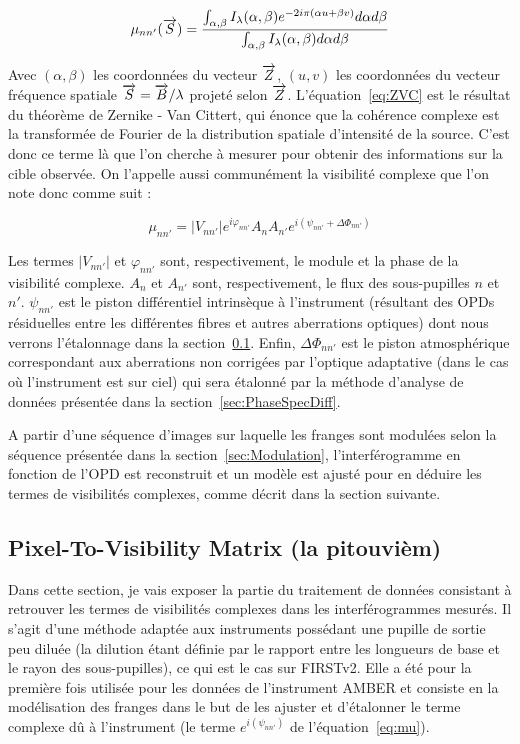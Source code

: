\begin{equation}
    \mu_{nn'}(\overrightarrow{S}) = \frac{\int_{\alpha, \beta} I_{\lambda}(\alpha,\beta) e^{-2i\pi (\alpha u + \beta v)} d\alpha d\beta}{\int_{\alpha, \beta} I_{\lambda}(\alpha,\beta) d\alpha d\beta} \label{eq:ZVC}
\end{equation}

Avec $(\alpha,\beta)$ les coordonnées du vecteur $\overrightarrow{Z}$, $(u, v)$ les coordonnées du vecteur fréquence spatiale $\overrightarrow{S} = \overrightarrow{B}/\lambda$ projeté selon $\overrightarrow{Z}$. L'équation~\ref{eq:ZVC} est le résultat du théorème de Zernike - Van Cittert, qui énonce que la cohérence complexe est la transformée de Fourier de la distribution spatiale d'intensité de la source. C'est donc ce terme là que l'on cherche à mesurer pour obtenir des informations sur la cible observée. On l'appelle aussi communément la visibilité complexe que l'on note donc comme suit :

\begin{equation}
	\mu_{nn'} = |V_{nn'}| e^{i\varphi_{nn'}} A_n A_{n'} e^{i(\psi_{nn'} + \Delta\Phi_{nn'})} \label{eq:mu}
\end{equation}

Les termes $|V_{nn'}|$ et $\varphi_{nn'}$ sont, respectivement, le module et la phase de la visibilité complexe. $A_n$ et $A_{n'}$ sont, respectivement, le flux des sous-pupilles $n$ et $n'$. $\psi_{nn'}$ est le piston différentiel intrinsèque à l'instrument (résultant des \ac{OPD}s résiduelles entre les différentes fibres et autres aberrations optiques) dont nous verrons l'étalonnage dans la section~\ref{sec:P2VM}. Enfin, $\Delta\Phi_{nn'}$ est le piston atmosphérique correspondant aux aberrations non corrigées par l'optique adaptative (dans le cas où l'instrument est sur ciel) qui sera étalonné par la méthode d'analyse de données présentée dans la section~\ref{sec:PhaseSpecDiff}.

A partir d'une séquence d'images sur laquelle les franges sont modulées selon la séquence présentée dans la section~\ref{sec:Modulation}, l'interférogramme en fonction de l'\ac{OPD} est reconstruit et un modèle est ajusté pour en déduire les termes de visibilités complexes, comme décrit dans la section suivante.


\subsection{Pixel-To-Visibility Matrix (la pitouvièm)}
\label{sec:P2VM}

Dans cette section, je vais exposer la partie du traitement de données consistant à retrouver les termes de visibilités complexes dans les interférogrammes mesurés. Il s'agit d'une méthode adaptée aux instruments possédant une pupille de sortie peu diluée (la dilution étant définie par le rapport entre les longueurs de base et le rayon des sous-pupilles), ce qui est le cas sur FIRSTv2. Elle a été pour la première fois utilisée pour les données de l'instrument \ac{AMBER} \citep{millour2004, tatulli2007} et consiste en la modélisation des franges dans le but de les ajuster et d'étalonner le terme complexe dû à l'instrument (le terme $e^{i(\psi_{nn'})}$ de l'équation~\ref{eq:mu}).

